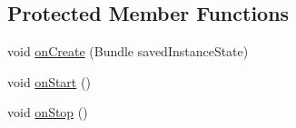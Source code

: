 \subsection*{Protected Member Functions}
\begin{DoxyCompactItemize}
\item 
void \hyperlink{classcom_1_1example_1_1fabien_1_1lo53__project_1_1MainActivity_a1e9059c6c2bcebb6e75b78cb4588b98a}{on\-Create} (Bundle saved\-Instance\-State)
\item 
void \hyperlink{classcom_1_1example_1_1fabien_1_1lo53__project_1_1MainActivity_a339cbc5d541c09e162894c57a8b81616}{on\-Start} ()
\item 
void \hyperlink{classcom_1_1example_1_1fabien_1_1lo53__project_1_1MainActivity_a7f0257fe40603349f15a4b4fdfb31864}{on\-Stop} ()
\end{DoxyCompactItemize}


